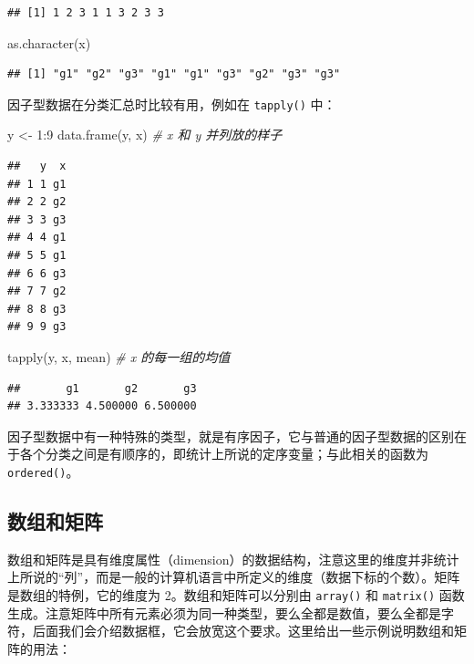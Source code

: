 \documentclass[
  b5paper,
  UTF8,twoside]{book}
\newenvironment{Shaded}{\begin{snugshade}}{\end{snugshade}}
\newcommand{\CommentTok}[1]{\textcolor[rgb]{0.56,0.35,0.01}{\textit{#1}}}
\newcommand{\DecValTok}[1]{\textcolor[rgb]{0.00,0.00,0.81}{#1}}
\newcommand{\FunctionTok}[1]{\textcolor[rgb]{0.00,0.00,0.00}{#1}}
\newcommand{\NormalTok}[1]{#1}
\newcommand{\OtherTok}[1]{\textcolor[rgb]{0.56,0.35,0.01}{#1}}
\newcommand{\SpecialCharTok}[1]{\textcolor[rgb]{0.00,0.00,0.00}{#1}}
\begin{document}
\begin{verbatim}
## [1] 1 2 3 1 1 3 2 3 3
\end{verbatim}

\begin{Shaded}
\begin{Highlighting}[]
\FunctionTok{as.character}\NormalTok{(x)}
\end{Highlighting}
\end{Shaded}

\begin{verbatim}
## [1] "g1" "g2" "g3" "g1" "g1" "g3" "g2" "g3" "g3"
\end{verbatim}

因子型数据在分类汇总时比较有用，例如在 \texttt{tapply()} 中：

\begin{Shaded}
\begin{Highlighting}[]
\NormalTok{y }\OtherTok{\textless{}{-}} \DecValTok{1}\SpecialCharTok{:}\DecValTok{9}
\FunctionTok{data.frame}\NormalTok{(y, x) }\CommentTok{\# x 和 y 并列放的样子}
\end{Highlighting}
\end{Shaded}

\begin{verbatim}
##   y  x
## 1 1 g1
## 2 2 g2
## 3 3 g3
## 4 4 g1
## 5 5 g1
## 6 6 g3
## 7 7 g2
## 8 8 g3
## 9 9 g3
\end{verbatim}

\begin{Shaded}
\begin{Highlighting}[]
\FunctionTok{tapply}\NormalTok{(y, x, mean) }\CommentTok{\# x 的每一组的均值}
\end{Highlighting}
\end{Shaded}

\begin{verbatim}
##       g1       g2       g3 
## 3.333333 4.500000 6.500000
\end{verbatim}

因子型数据中有一种特殊的类型，就是有序因子，它与普通的因子型数据的区别在于各个分类之间是有顺序的，即统计上所说的定序变量；与此相关的函数为 \texttt{ordered()}。

\hypertarget{ux6570ux7ec4ux548cux77e9ux9635}{%
\subsection{数组和矩阵}\label{ux6570ux7ec4ux548cux77e9ux9635}}

数组和矩阵是具有维度属性（dimension）的数据结构，注意这里的维度并非统计上所说的``列''，而是一般的计算机语言中所定义的维度（数据下标的个数）。矩阵是数组的特例，它的维度为 2。数组和矩阵可以分别由 \texttt{array()} 和 \texttt{matrix()} 函数生成。注意矩阵中所有元素必须为同一种类型，要么全都是数值，要么全都是字符，后面我们会介绍数据框，它会放宽这个要求。这里给出一些示例说明数组和矩阵的用法：
\end{document}
